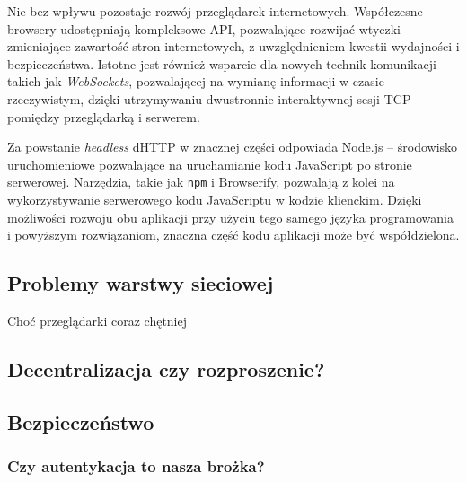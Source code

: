 Nie bez wpływu pozostaje rozwój przeglądarek internetowych. Współczesne browsery udostępniają kompleksowe API, pozwalające rozwijać wtyczki zmieniające zawartość stron internetowych, z uwzględnieniem kwestii wydajności i bezpieczeństwa. Istotne jest również wsparcie dla nowych technik komunikacji takich jak {\em WebSockets}, pozwalającej na wymianę informacji w czasie rzeczywistym, dzięki utrzymywaniu dwustronnie interaktywnej sesji TCP pomiędzy przeglądarką i serwerem.

Za powstanie {\em headless} dHTTP w znacznej części odpowiada Node.js -- środowisko uruchomieniowe pozwalające na uruchamianie kodu JavaScript po stronie serwerowej.  Narzędzia, takie jak \texttt{npm} i Browserify, pozwalają z kolei na wykorzystywanie serwerowego kodu JavaScriptu w kodzie klienckim. Dzięki możliwości rozwoju obu aplikacji przy użyciu tego samego języka programowania i powyższym rozwiązaniom, znaczna część  kodu aplikacji może być współdzielona.



\subsection{Problemy warstwy sieciowej}
\label{sec:networkIssues}

Choć przeglądarki coraz chętniej


\subsection{Decentralizacja czy rozproszenie?}
\label{sec:decentralizacjaCzyRozproszenie}

\subsection{Bezpieczeństwo}
\label{sec:security}

\subsubsection{Czy autentykacja to nasza brożka?}
